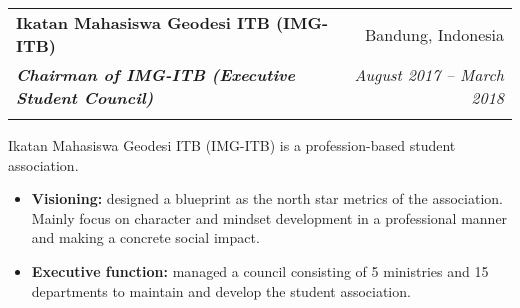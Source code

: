 \documentclass[a4paper, 11pt]{article}
\makeatletter
\newcommand{\resumeItem}[2]{
    \item\small{
        \textbf{#1}{#2 \vspace{-2pt}}
    }
}
\newcommand{\resumeSubheading}[4]{
    \vspace{-1pt}
    \begin{tabular*}{\textwidth}{l@{\extracolsep{\fill}}r}
        \color{lightblue}\textbf{#1} & #2 \\
        \textbf{\textit{\small#3}} & \textit{\small #4} \\
        \textnormal{}\vspace{-5pt}
    \end{tabular*}\vspace{-5pt}
}
\newcommand{\resumeItemListStart}{\begin{itemize}[leftmargin=*]\setlength\itemsep{0em}\vspace{-1pt}}
\newcommand{\resumeItemListEnd}{\end{itemize}\vspace{-5pt}}
\makeatother
\begin{document}
    \vspace{5pt}
    \resumeSubheading
    {Ikatan Mahasiswa Geodesi ITB (IMG-ITB)}
    {Bandung, Indonesia}
    {Chairman of IMG-ITB (Executive Student Council)}
    {August 2017 – March 2018}
    \small{Ikatan Mahasiswa Geodesi ITB (IMG-ITB) is a profession-based student association.}
    \vspace{-1pt}
    \resumeItemListStart
    \resumeItem{Visioning:}{ designed a blueprint as the north star metrics of the
    association. Mainly focus on character and mindset development in a
    professional manner and making a concrete social impact.}
    \resumeItem{Executive function:}{ managed a council consisting of 5 ministries and 15
    departments to maintain and develop the student association.}
    \resumeItemListEnd
\end{document}
